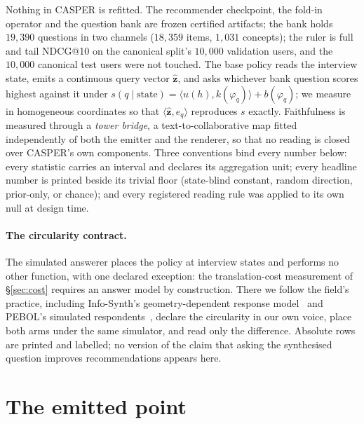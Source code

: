 \documentclass[11pt]{article}
\newcommand{\zz}{\mathbf{z}}
\newcommand{\zhat}{\hat{\zz}}
\begin{document}
Nothing in CASPER is refitted. The recommender checkpoint, the fold-in operator and the
question bank are frozen certified artifacts; the bank holds $19{,}390$ questions in two channels
($18{,}359$ items, $1{,}031$ concepts); the ruler is full and tail NDCG@10 on the canonical split's
$10{,}000$ validation users, and the $10{,}000$ canonical test users were not touched. The base policy
reads the interview state, emits a continuous query vector $\zhat$, and asks whichever bank question
scores highest against it under $s(q\mid\text{state}) = \langle u(h),k(\varphi_q)\rangle +
b(\varphi_q)$; we measure in homogeneous coordinates so that $\langle\zhat,e_q\rangle$ reproduces $s$
exactly. Faithfulness is measured through a \emph{tower bridge}, a text-to-collaborative map fitted
independently of both the emitter and the renderer, so that no reading is closed over CASPER's own
components. Three conventions bind every number below: every statistic carries an interval and
declares its aggregation unit; every headline number is printed beside its trivial floor (state-blind
constant, random direction, prior-only, or chance); and every registered reading rule was applied to
its own null at design time.

\paragraph{The circularity contract.} The simulated answerer places the policy at interview states and
performs no other function, with one declared exception: the translation-cost measurement of
\S\ref{sec:cost} requires an answer model by construction. There we follow the field's practice,
including Info-Synth's geometry-dependent response model~\cite{nadagouda2026infosynth} and PEBOL's
simulated respondents~\cite{austin2024bayesian}, declare the circularity in our own voice, place both
arms under the same simulator, and read only the difference. Absolute rows are printed and labelled;
no version of the claim that asking the synthesised question improves recommendations appears here.

\section{The emitted point}
\label{sec:point}
\end{document}
